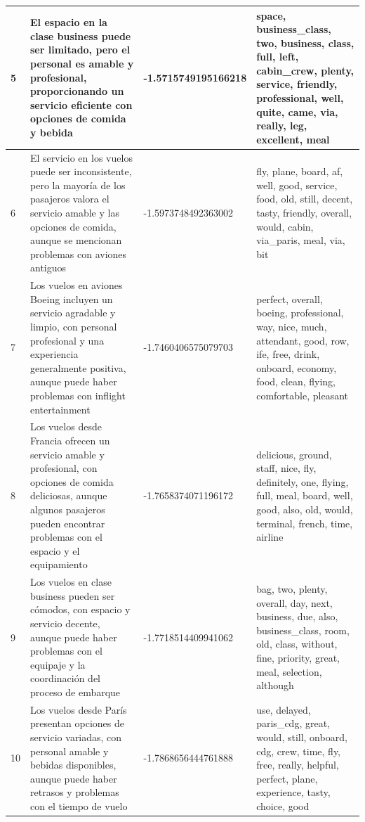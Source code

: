\documentclass{report}
\begin{document}
{\begin{longtable}{|p{1cm}|p{4cm}|p{4cm}|p{6cm}|}
                    \hline
                    5 & El espacio en la clase business puede ser limitado, pero el personal es amable y profesional, proporcionando un servicio eficiente con opciones de comida y bebida & -1.5715749195166218 & space, business\_class, two, business, class, full, left, cabin\_crew, plenty, service, friendly, professional, well, quite, came, via, really, leg, excellent, meal \\
                    \hline
                    6 & El servicio en los vuelos puede ser inconsistente, pero la mayoría de los pasajeros valora el servicio amable y las opciones de comida, aunque se mencionan problemas con aviones antiguos & -1.5973748492363002 & fly, plane, board, af, well, good, service, food, old, still, decent, tasty, friendly, overall, would, cabin, via\_paris, meal, via, bit \\
                    \hline
                    7 & Los vuelos en aviones Boeing incluyen un servicio agradable y limpio, con personal profesional y una experiencia generalmente positiva, aunque puede haber problemas con inflight entertainment & -1.7460406575079703 & perfect, overall, boeing, professional, way, nice, much, attendant, good, row, ife, free, drink, onboard, economy, food, clean, flying, comfortable, pleasant \\
                    \hline
                    8 & Los vuelos desde Francia ofrecen un servicio amable y profesional, con opciones de comida deliciosas, aunque algunos pasajeros pueden encontrar problemas con el espacio y el equipamiento & -1.7658374071196172 & delicious, ground, staff, nice, fly, definitely, one, flying, full, meal, board, well, good, also, old, would, terminal, french, time, airline \\
                    \hline
                    9 & Los vuelos en clase business pueden ser cómodos, con espacio y servicio decente, aunque puede haber problemas con el equipaje y la coordinación del proceso de embarque & -1.7718514409941062 & bag, two, plenty, overall, day, next, business, due, also, business\_class, room, old, class, without, fine, priority, great, meal, selection, although \\
                    \hline
                    10 & Los vuelos desde París presentan opciones de servicio variadas, con personal amable y bebidas disponibles, aunque puede haber retrasos y problemas con el tiempo de vuelo & -1.7868656444761888 & use, delayed, paris\_cdg, great, would, still, onboard, cdg, crew, time, fly, free, really, helpful, perfect, plane, experience, tasty, choice, good \\

\end{longtable}}
\end{document}
